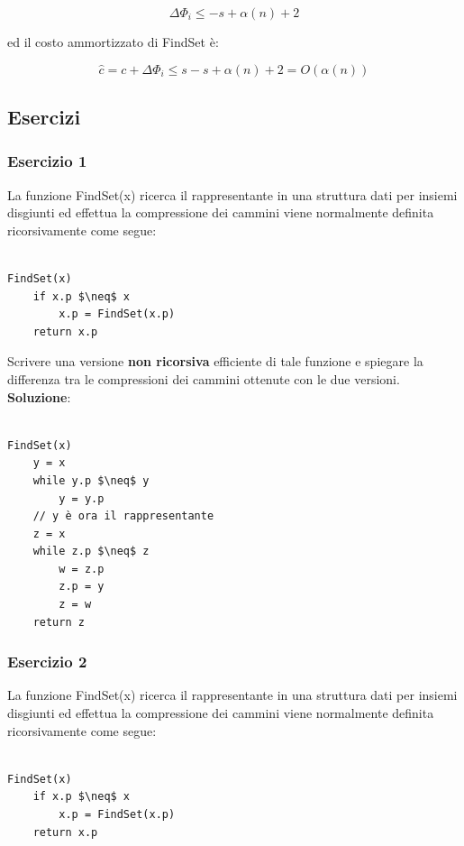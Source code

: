 $$\Delta\Phi_i\le-s+\alpha(n)+2$$

ed il costo ammortizzato di FindSet è:

$$\hat{c}=c+\Delta\Phi_i\le s-s+\alpha(n)+2=O(\alpha(n))$$

\subsection{Esercizi}

\subsubsection{Esercizio 1}

La funzione FindSet(x) ricerca il rappresentante in una struttura dati per insiemi disgiunti ed effettua la compressione dei cammini viene normalmente definita ricorsivamente come segue:

\begin{lstlisting}[mathescape=true]

FindSet(x)
	if x.p $\neq$ x
		x.p = FindSet(x.p)
	return x.p

\end{lstlisting}

Scrivere una versione \textbf{non ricorsiva} efficiente di tale funzione e spiegare la differenza tra le compressioni dei cammini ottenute con le due versioni.
\linebreak
\linebreak
\textbf{Soluzione}:

\begin{lstlisting}[mathescape=true]

FindSet(x)
	y = x
	while y.p $\neq$ y
		y = y.p
	// y è ora il rappresentante
	z = x
	while z.p $\neq$ z
		w = z.p
		z.p = y
		z = w
	return z

\end{lstlisting}

\subsubsection{Esercizio 2}

La funzione FindSet(x) ricerca il rappresentante in una struttura dati per insiemi disgiunti ed effettua la compressione dei cammini viene normalmente definita ricorsivamente come segue:

\begin{lstlisting}[mathescape=true]

FindSet(x)
	if x.p $\neq$ x
		x.p = FindSet(x.p)
	return x.p

\end{lstlisting}

